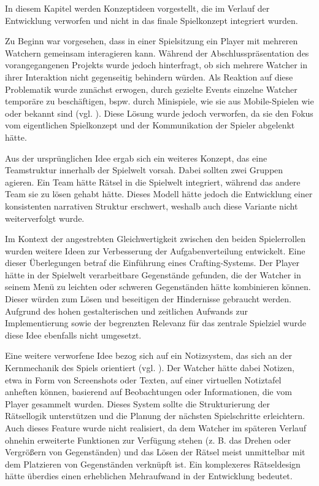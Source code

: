 In diesem Kapitel werden Konzeptideen vorgestellt, die im Verlauf der Entwicklung verworfen und nicht in das finale Spielkonzept integriert wurden.

Zu Beginn war vorgesehen, dass in einer Spielsitzung ein Player mit mehreren Watchern gemeinsam interagieren kann. Während der Abschlusspräsentation des vorangegangenen Projekts wurde jedoch hinterfragt, ob sich mehrere Watcher in ihrer Interaktion nicht gegenseitig behindern würden. Als Reaktion auf diese Problematik wurde zunächst erwogen, durch gezielte Events einzelne Watcher temporäre zu beschäftigen, bspw. durch Minispiele, wie sie aus Mobile-Spielen wie  oder  bekannt sind (vgl. \citealp{everbyte_duskwood_2019,jaunt_sentence_2019}). Diese Lösung wurde jedoch verworfen, da sie den Fokus vom eigentlichen Spielkonzept und der Kommunikation der Spieler abgelenkt hätte.

Aus der ursprünglichen Idee ergab sich ein weiteres Konzept, das eine Teamstruktur innerhalb der Spielwelt vorsah. Dabei sollten zwei Gruppen agieren. Ein Team hätte Rätsel in die Spielwelt integriert, während das andere Team sie zu lösen gehabt hätte. Dieses Modell hätte jedoch die Entwicklung einer konsistenten narrativen Struktur erschwert, weshalb auch diese Variante nicht weiterverfolgt wurde.

Im Kontext der angestrebten Gleichwertigkeit zwischen den beiden Spielerrollen wurden weitere Ideen zur Verbesserung der Aufgabenverteilung entwickelt. Eine dieser Überlegungen betraf die Einführung eines Crafting-Systems. Der Player hätte in der Spielwelt verarbeitbare Gegenstände gefunden, die der Watcher in seinem Menü zu leichten oder schweren Gegenständen hätte kombinieren können. Dieser würden zum Lösen und beseitigen der Hindernisse gebraucht werden. Aufgrund des hohen gestalterischen und zeitlichen Aufwands zur Implementierung sowie der begrenzten Relevanz für das zentrale Spielziel wurde diese Idee ebenfalls nicht umgesetzt.

Eine weitere verworfene Idee bezog sich auf ein Notizsystem, das sich an der Kernmechanik des Spiels  orientiert (vgl. \citealp{colepowered_games_shadows_2023}). Der Watcher hätte dabei Notizen, etwa in Form von Screenshots oder Texten, auf einer virtuellen Notiztafel anheften können, basierend auf Beobachtungen oder Informationen, die vom Player gesammelt wurden. Dieses System sollte die Strukturierung der Rätsellogik unterstützen und die Planung der nächsten Spielschritte erleichtern. Auch dieses Feature wurde nicht realisiert, da dem Watcher im späteren Verlauf ohnehin erweiterte Funktionen zur Verfügung stehen (z. B. das Drehen oder Vergrößern von Gegenständen) und das Lösen der Rätsel meist unmittelbar mit dem Platzieren von Gegenständen verknüpft ist. Ein komplexeres Rätseldesign hätte überdies einen erheblichen Mehraufwand in der Entwicklung bedeutet. 